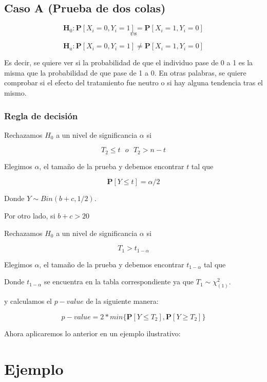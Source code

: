\documentclass[
  a4paper,
  oneside,
  openany]{book}
\begin{document}
\hypertarget{caso-a-prueba-de-dos-colas-3}{%
\subsection*{Caso A (Prueba de dos colas)}\label{caso-a-prueba-de-dos-colas-3}}


\[\textbf{H}_0: \mathbf{P}[X_{i}=0,Y_{i}=1]= \mathbf{P}[X_{i}=1,Y_{i}=0]\]
\[vs\]

\[\textbf{H}_a: \mathbf{P}[X_{i}=0,Y_{i}=1]\neq \mathbf{P}[X_{i}=1,Y_{i}=0]\]

Es decir, se quiere ver si la probabilidad de que el individuo pase de 0 a 1 es la misma que la probabilidad de que pase de 1 a 0. En otras palabras, se quiere comprobar si el efecto del tratamiento fue neutro o si hay alguna tendencia tras el mismo.

\hypertarget{regla-de-decisiuxf3n-9}{%
\subsubsection*{Regla de decisión}\label{regla-de-decisiuxf3n-9}}


Rechazamos \(H_0\) a un nivel de significancia \(\alpha\) si

\[T_{2} \leq t \ \ \   o \ \ \ T_{2}>n-t\]

Elegimos \(\alpha\), el tamaño de la prueba y debemos encontrar \(t\) tal que

\[\mathbf{P}[Y \leq t]=\alpha/2\]

Donde \(Y \sim Bin (b+c,1/2)\).

Por otro lado, si \(b+c>20\)

Rechazamos \(H_0\) a un nivel de significancia \(\alpha\) si

\[T_{1} > t_{1-\alpha}\]

Elegimos \(\alpha\), el tamaño de la prueba y debemos encontrar \(t_{1-\alpha}\) tal que

Donde \(t_{1-\alpha}\) se encuentra en la tabla correspondiente ya que \(T_{1} \sim \chi^{2}_{(1)}\).

y calculamos el \(p-value\) de la siguiente manera:

\[p-value=2*min\{\mathbf{P}[Y\leq T_{2}],\mathbf{P}[Y\geq T_{2}]\}\]

Ahora aplicaremos lo anterior en un ejemplo ilustrativo:

\hypertarget{ejemplo-3}{%
\section{Ejemplo}\label{ejemplo-3}}
\end{document}
